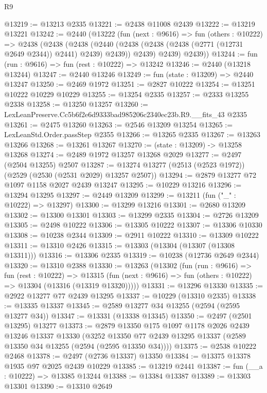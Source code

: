 \begin{lexlean}{R9}
\begin{coremodule}
@13219 := @13213 @2335
@13221 := @2438 @11008 @2439
@13222 := @13219 @13221
@13242 := @2440
    (@13222
      (fun (next : @9616) =>
      fun (others : @10222) =>
      @2438
        (@2438
          (@2438
            (@2440 (@2438 (@2438 (@2438 (@2771 (@12731 @2649 @2344)) @2441) @2439) @2439))
            @2439)
          @2439)
        @2439))
@13244 := fun (run : @9616) => fun (rest : @10222) => @13242
@13246 := @2440 (@13218 @13244)
@13247 := @2440 @13246
@13249 := fun (state : @13209) => @2440 @13247
@13250 := @2469 @1972
@13251 := @2827 @10222
@13254 := @13251 @10222 @10229 @10229
@13255 := @13254 @2335
@13257 := @2333 @13255 @2338
@13258 := @13250 @13257
@13260 := LexLeanPreserve.Cc5b6f2e6d9333bad985206c2340ec23b.R9.__fits_43 @2335
@13261 := @2475 @13260
@13263 := @2546 @13209 @13254
@13265 := LexLeanStd.Order.passStep @2355
@13266 := @13265 @2335
@13267 := @13263 @13266
@13268 := @13261 @13267
@13270 := (state : @13209) -> @13258 @13268
@13274 := @2489 @1972 @13257 @13268 @2029
@13277 := @2497 (@2504 @13255) @2507
@13287 := @13274 @13277 (@2513 (@2523 @1972)) (@2529 (@2530 (@2531 @2029) @13257 @2507))
@13294 := @2879 @13277 @72 @1097 @1158 @2027 @2439 @13247
@13295 := @10229 @13216
@13296 := @13294 @13295
@13297 := @2449 @13209
@13299 := @13211 (fun ("_" : @10222) => @13297)
@13300 := @13299 @13216
@13301 := @2680 @13209
@13302 := @13300 @13301
@13303 := @13299 @2335
@13304 := @2726 @13209
@13305 := @2498 @10222
@13306 := @13305 @10222
@13307 := @13306 @10330
@13308 := @10238 @2344
@13309 := @2911 @10222
@13310 := @13309 @10222
@13311 := @13310 @2426
@13315 := @13303 (@13304 (@13307 (@13308 @13311)))
@13316 := @13306 @2335
@13319 := @10238 (@12736 @2649 @2344)
@13320 := @13310 @2388
@13330 := @13263
    (@13302
      (fun (run : @9616) =>
      fun (rest : @10222) =>
      @13315 (fun (next : @9616) => fun (others : @10222) => @13304 (@13316 (@13319 @13320)))))
@13331 := @13296 @13330
@13335 := @2922 @13277 @77 @2439 @13295
@13337 := @10229 (@13310 @2335)
@13338 := @13335 @13337
@13345 := @2589 @13277 @34 @13255 (@2594 (@2595 @13277 @34))
@13347 := @13331 (@13338 @13345)
@13350 := @2497 (@2501 @13295) @13277
@13373 := @2879
    @13350
    @175
    @1097
    @1178
    @2026
    @2439
    @13246
    @13337
    @13330
    (@3252 @13350 @77 @2439 @13295 @13337 (@2589 @13350 @34 @13255 (@2594 (@2595 @13350 @34))))
@13375 := @2538 @10222 @2468
@13378 := @2497 (@2736 @13337) @13350
@13384 := @13375 @13378 @1935 @97 @2025 @2439 @10229
@13385 := @13219 @2441
@13387 := fun (__a : @10222) => @13385 @13244
@13388 := @13384 @13387
@13389 := @13303 @13301
@13390 := @13310 @2649

\end{coremodule}
\end{lexlean}
